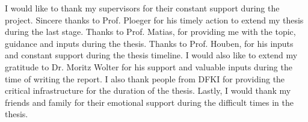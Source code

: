 




    \begin{acknowledgements}
      I would like to thank my supervisors for their constant support during the project.
      Sincere thanks to Prof. Ploeger for his timely action to extend my thesis during the last stage.
      Thanks to Prof. Matias, for providing me with the topic, guidance and inputs during the thesis.
      Thanks to Prof. Houben, for his inputs and constant support during the thesis timeline.
      I would also like to extend my gratitude to Dr. Moritz Wolter for his support and valuable inputs during the time of writing the report.
      I also thank people from DFKI for providing the critical infrastructure for the duration of the thesis.
      Lastly, I would thank my friends and family for their emotional support during the difficult times in the thesis.
    \end{acknowledgements}

